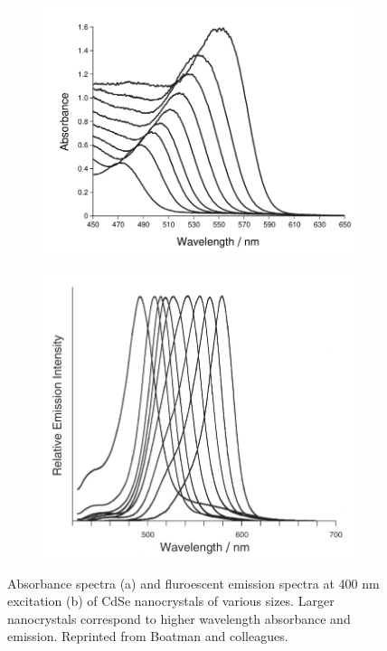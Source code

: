 \documentclass[journal = jceda8, manuscript = article]{achemso}
\begin{document}
\begin{figure}[ht]%
	\centering%
	\begin{subfigure}[b]{0.5 \textwidth}%
		\centering%
		\includegraphics[width=\textwidth]{./figures/absorbance}%
		\subcaption{}%
	\end{subfigure}%
	\hfill%
	\begin{subfigure}[b]{0.5 \textwidth}%
		\centering%
		\includegraphics[width=\textwidth]{./figures/emission}%
		\subcaption{}%
	\end{subfigure}%
	\caption{Absorbance spectra (a) and fluroescent emission spectra at 400
	nm excitation (b) of CdSe nanocrystals of various sizes. Larger
	nanocrystals correspond to higher wavelength absorbance and emission. Reprinted
	from Boatman and colleagues. \cite{jce-2}}%
\end{figure}%
\end{document}
